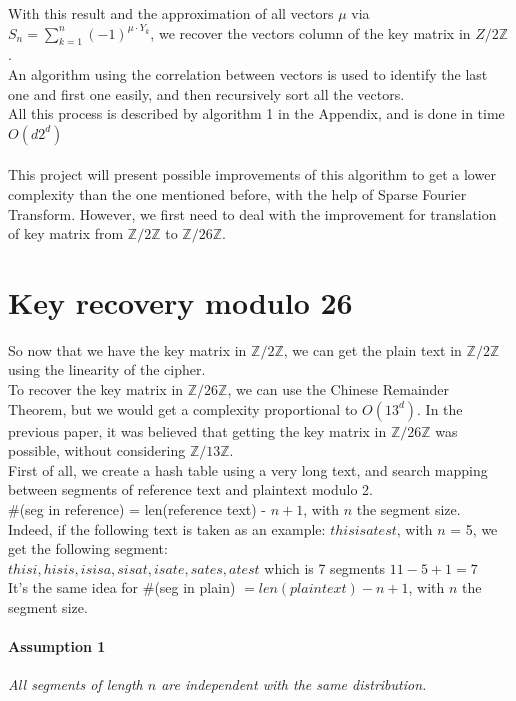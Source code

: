 \documentclass{article}
\begin{document}
With this result and the approximation of all vectors $\mu$ via $S_n = \sum_{k=1}^{n}{(-1)^{\mu \cdot Y_{k}}}$, we recover the vectors column of the key matrix in ${Z}/2\mathbb{Z}$.\\
An algorithm using the correlation between vectors is used to identify the last one and first one easily, and then recursively sort all the vectors.\\
All this process is described by algorithm 1 in the Appendix, and is done in time $O(d 2^d)$\\
\\
This project will present possible improvements of this algorithm to get a lower complexity than the one mentioned before, with the help of Sparse Fourier Transform. However, we first need to deal with the improvement for translation of key matrix from $\mathbb{Z}/2\mathbb{Z}$ to $\mathbb{Z}/26\mathbb{Z}$.


\section{Key recovery modulo 26}
So now that we have the key matrix in $\mathbb{Z}/2\mathbb{Z}$, we can get the plain text in $\mathbb{Z}/2\mathbb{Z}$ using the linearity of the cipher.\\
To recover the key matrix in $\mathbb{Z}/26\mathbb{Z}$, we can use the Chinese Remainder Theorem, but we would get a complexity proportional to $O(13^d)$. In the previous paper, it was believed that getting the key matrix in $\mathbb{Z}/26\mathbb{Z}$ was possible, without considering $\mathbb{Z}/13\mathbb{Z}$.\\
First of all, we create a hash table using a very long text, and search mapping between segments of reference text and plaintext modulo 2.\\
\#(seg in reference) = len(reference text) - $n +1$, with $n$ the segment size.\\
Indeed, if the following text is taken as an example: $thisisatest$, with $n$ = 5, we get the following segment:\\
 $ thisi, hisis, isisa, sisat, isate, sates, atest $ which is 7 segments $ 11 - 5 + 1 = 7 $\\
It's the same idea for \#(seg in plain) $= len(plain text) - n +1$, with $n$ the segment size.\\
\paragraph{Assumption 1}\textit{All segments of length $n$ are independent with the same distribution.}
\end{document}
